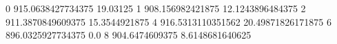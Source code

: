 0 915.0638427734375 19.03125
1 908.156982421875 12.1243896484375
2 911.3870849609375 15.3544921875
4 916.5313110351562 20.49871826171875
6 896.0325927734375 0.0
8 904.6474609375 8.6148681640625
